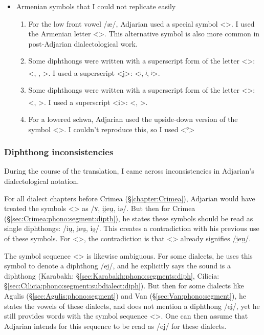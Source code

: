 \begin{itemize}
	\item Armenian symbols that I could not replicate easily 
	\begin{enumerate}
\item For the low front vowel /æ/, Adjarian used a special symbol 
<>. I used the  Armenian letter <̈>. This alternative symbol is also more common in post-Adjarian dialectological work. 
\item Some diphthongs were written with a superscript form of the letter <>: <\textsuperscript{}, \textsuperscript{},   \textsuperscript{}>. I used a superscript <j>: 	<ʲ, ʲ, ʲ>. 
\item Some diphthongs were written with a superscript form of the letter <>: <\textsuperscript{}, \textsuperscript{}>. I used a superscript <i>: 	<, >. 
\item For a lowered schwa, Adjarian used the  upside-down version of the symbol <>. I couldn't reproduce this, so I used  <°> 
	\end{enumerate}
\end{itemize}



\subsubsection{Diphthong inconsistencies}\label{sec:HossepIntro:phonotransc:adjerror}

During the course of the translation, I came across inconsistencies in Adjarian's dialectological notation. 

For all dialect chapters before Crimea (\S\ref{chapter:Crimea}), Adjarian would have treated the symbols <> as  /ʏ, ii̯eu̯, iə/. But then for Crimea (\S\ref{sec:Crimea:phono:segment:dipth}), he states these symbols should be read as single diphthongs: /iu̯, i̯eu̯,  iə̯/. This creates a contradiction with his previous use of these symbols. For <>, the contradiction is that <> already signifies /i̯eu̯/. 


The symbol sequence <> is likewise ambiguous. For some dialects, he uses this symbol to denote a diphthong /ei̯/, and he explicitly says the sound is a diphthong (Karabakh: \S\ref{sec:Karabakh:phono:segments:diph}, Cilicia: \S\ref{sec:Cilicia:phono:segment:subdialect:diph}). But then for some dialects like Agulis (\S\ref{sec:Agulis:phono:segment}) and Van (\S\ref{sec:Van:phono:segment}), he states the vowels of these dialects, and does not mention a diphthong /ei̯/, yet he still provides words with the symbol sequence <>. One can then assume that Adjarian intends for this sequence to be read as /ej/ for these dialects.  

